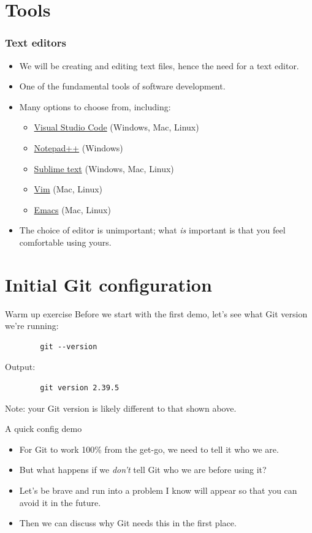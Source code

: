 \documentclass{git_course}
\begin{document}
\section{Tools}

\begin{frame}
\frametitle{Text editors}
\begin{itemize}
    \item We will be creating and editing text files, hence the need for a
        text editor.
    \item One of the fundamental tools of software development.
    \item Many options to choose from, including:
    \begin{itemize}
        \item \href{https://code.visualstudio.com/}{Visual Studio Code} (Windows, Mac, Linux)
        \item \href{https://notepad-plus-plus.org/}{Notepad++} (Windows)
        \item \href{https://www.sublimetext.com/}{Sublime text} (Windows, Mac, Linux)
        \item \href{https://www.vim.org/}{Vim} (Mac, Linux)
        \item \href{https://www.gnu.org/software/emacs/}{Emacs} (Mac, Linux)
    \end{itemize}
    \item The choice of editor is unimportant; what \emph{is} important is
        that you feel comfortable using yours.
\end{itemize}
\end{frame}

\section{Initial Git configuration}

\begin{frame}[fragile]{Warm up exercise}
    Before we start with the first demo, let's see what Git version we're
    running:
    \begin{verbatim}
        git --version
    \end{verbatim}
    Output:
    \begin{verbatim}
        git version 2.39.5
    \end{verbatim}
    Note: your Git version is likely different to that shown above.
\end{frame}

\begin{frame}{A quick config demo}
    \begin{itemize}
        \item For Git to work 100\% from the get-go, we need to tell it who
            we are.
        \item But what happens if we \emph{don't} tell Git who we are before using it?
        \item Let's be brave and run into a problem I know will appear so
            that you can avoid it in the future.
        \item Then we can discuss why Git needs this in the first place.
    \end{itemize}
\end{frame}
\end{document}
